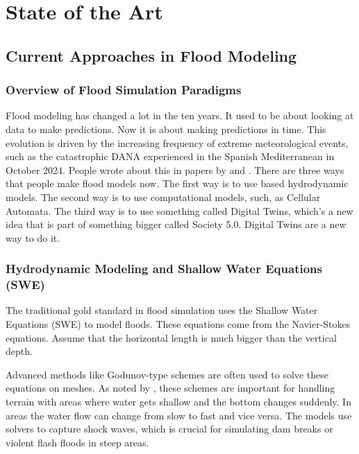 \chapter{State of the Art}
\label{chapter:state_of_the_art}

\section{Current Approaches in Flood Modeling}

\subsection{Overview of Flood Simulation Paradigms}

Flood modeling has changed a lot in the ten years. It used to be about looking at data to make predictions. Now it is about making 
predictions in time. This evolution is driven by the increasing frequency of extreme meteorological events, such as the catastrophic 
DANA experienced in the Spanish Mediterranean in October 2024. People wrote about this in papers by \cite{SeguraBeltran2025} and 
\cite{Muoz2025}. There are three ways that people make flood models now. The first way is to use based hydrodynamic models. The second 
way is to use computational models, such, as Cellular Automata. The third way is to use something called Digital Twins, which's a new 
idea that is part of something bigger called Society 5.0. Digital Twins are a new way to do it.


\subsection{Hydrodynamic Modeling and Shallow Water Equations (SWE)}

The traditional gold standard in flood simulation uses the Shallow Water Equations (SWE) to model floods. These equations come from 
the Navier-Stokes equations. Assume that the horizontal length is much bigger than the vertical depth.

Advanced methods like Godunov-type schemes are often used to solve these equations on meshes. As noted by \cite{Aleksyuk2017}, these 
schemes are important for handling terrain with areas where water gets shallow and the bottom changes suddenly. In areas the water 
flow can change from slow to fast and vice versa. The models use solvers to capture shock waves, which is crucial for simulating dam 
breaks or violent flash floods in steep areas. 

